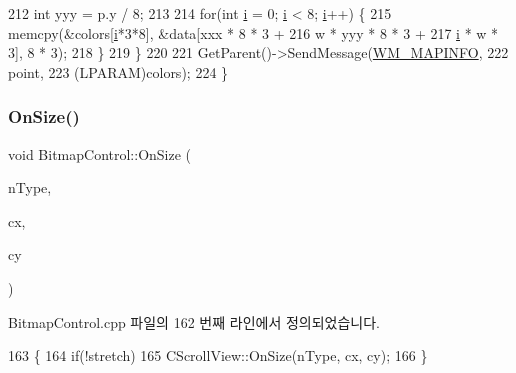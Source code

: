 \begin{DoxyCode}
212     \textcolor{keywordtype}{int} yyy = p.y / 8;
213 
214     \textcolor{keywordflow}{for}(\textcolor{keywordtype}{int} \mbox{\hyperlink{expr-lex_8cpp_acb559820d9ca11295b4500f179ef6392}{i}} = 0; \mbox{\hyperlink{expr-lex_8cpp_acb559820d9ca11295b4500f179ef6392}{i}} < 8; \mbox{\hyperlink{expr-lex_8cpp_acb559820d9ca11295b4500f179ef6392}{i}}++) \{
215       memcpy(&colors[\mbox{\hyperlink{expr-lex_8cpp_acb559820d9ca11295b4500f179ef6392}{i}}*3*8], &data[xxx * 8 * 3 +
216                                    w * yyy * 8 * 3 +
217                                    \mbox{\hyperlink{expr-lex_8cpp_acb559820d9ca11295b4500f179ef6392}{i}} * w * 3], 8 * 3);
218     \}
219   \}
220   
221   GetParent()->SendMessage(\mbox{\hyperlink{_bitmap_control_8h_ae24606181d32c185412adb28acfa95cb}{WM\_MAPINFO}},
222                            point,
223                            (LPARAM)colors);
224 \}
\end{DoxyCode}
\mbox{\label{class_bitmap_control_ac0e60f98809d78a38d5d35942c1bfb2c}} 
\subsubsection{\texorpdfstring{On\+Size()}{OnSize()}}
{\footnotesize\ttfamily void Bitmap\+Control\+::\+On\+Size (\begin{DoxyParamCaption}\item[{U\+I\+NT}]{n\+Type,  }\item[{\mbox{\hyperlink{_util_8cpp_a0ef32aa8672df19503a49fab2d0c8071}{int}}}]{cx,  }\item[{\mbox{\hyperlink{_util_8cpp_a0ef32aa8672df19503a49fab2d0c8071}{int}}}]{cy }\end{DoxyParamCaption})\hspace{0.3cm}{\ttfamily [protected]}}



Bitmap\+Control.\+cpp 파일의 162 번째 라인에서 정의되었습니다.


\begin{DoxyCode}
163 \{
164   \textcolor{keywordflow}{if}(!stretch)
165     CScrollView::OnSize(nType, cx, cy);
166 \}
\end{DoxyCode}
\mbox{\label{class_bitmap_control_aed7e031df3fd65a4325ea9bf7da5bdc3}} 
